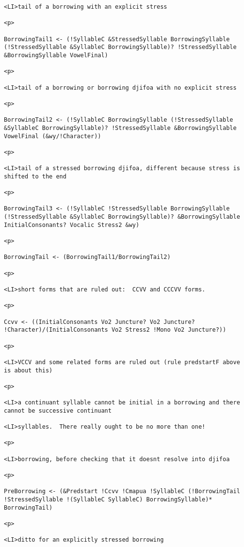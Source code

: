 \documentclass[12pt]{article}
\begin{document}
\begin{lstlisting}
<LI>tail of a borrowing with an explicit stress

<p>

BorrowingTail1 <- (!SyllableC &StressedSyllable BorrowingSyllable (!StressedSyllable &SyllableC BorrowingSyllable)? !StressedSyllable &BorrowingSyllable VowelFinal)

<p>

<LI>tail of a borrowing or borrowing djifoa with no explicit stress

<p>

BorrowingTail2 <- (!SyllableC BorrowingSyllable (!StressedSyllable &SyllableC BorrowingSyllable)? !StressedSyllable &BorrowingSyllable VowelFinal (&wy/!Character))

<p>

<LI>tail of a stressed borrowing djifoa, different because stress is shifted to the end

<p>

BorrowingTail3 <- (!SyllableC !StressedSyllable BorrowingSyllable (!StressedSyllable &SyllableC BorrowingSyllable)? &BorrowingSyllable InitialConsonants? Vocalic Stress2 &wy)

<p>

BorrowingTail <- (BorrowingTail1/BorrowingTail2)

<p>

<LI>short forms that are ruled out:  CCVV and CCCVV forms.

<p>

Ccvv <- ((InitialConsonants Vo2 Juncture? Vo2 Juncture? !Character)/(InitialConsonants Vo2 Stress2 !Mono Vo2 Juncture?))

<p>

<LI>VCCV and some related forms are ruled out (rule predstartF above is about this)

<p>

<LI>a continuant syllable cannot be initial in a borrowing and there cannot be successive continuant

<LI>syllables.  There really ought to be no more than one!

<p>

<LI>borrowing, before checking that it doesnt resolve into djifoa

<p>

PreBorrowing <- (&Predstart !Ccvv !Cmapua !SyllableC (!BorrowingTail !StressedSyllable !(SyllableC SyllableC) BorrowingSyllable)* BorrowingTail)

<p>

<LI>ditto for an explicitly stressed borrowing


\end{lstlisting}
\end{document}
